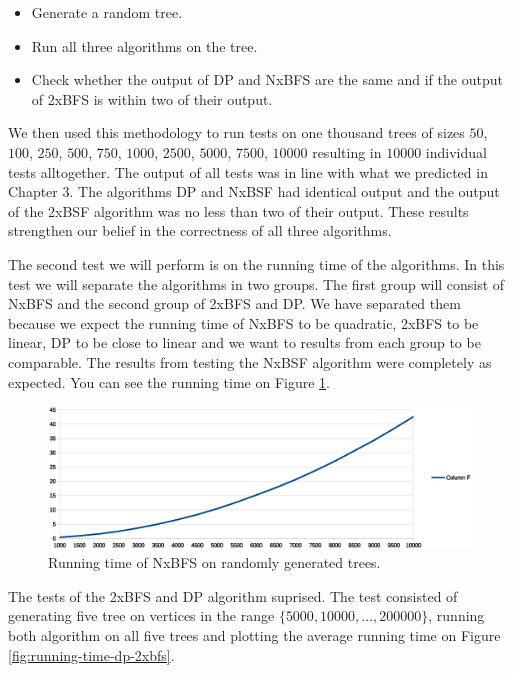 \begin{itemize}
    \item Generate a random tree.
    \item Run all three algorithms on the tree.
    \item Check whether the output of DP and NxBFS are the same and if the output of 2xBFS is within two of their output.
\end{itemize}

We then used this methodology to run tests on one thousand trees of sizes $50$, $100$, $250$, $500$, $750$, $1000$, $2500$, $5000$, $7500$, $10000$ resulting in $10000$ individual tests alltogether. The output of all tests was in line with what we predicted in Chapter 3. The algorithms DP and NxBSF had identical output and the output of the 2xBSF algorithm was no less than two of their output. These results strengthen our belief in the correctness of all three algorithms.

The second test we will perform is on the running time of the algorithms. In this test we will separate the algorithms in two groups. The first group will consist of NxBFS and the second group of 2xBFS and DP. We have separated them because we expect the running time of NxBFS to be quadratic, 2xBFS to be linear, DP to be close to linear and we want to results from each group to be comparable. The results from testing the NxBSF algorithm were completely as expected. You can see the running time on Figure \ref{fig:running-time-nxbfs}.

\begin{figure}[h]%
    \centering
    \includegraphics[center, scale=0.6 ]{./images/empirical/chart-nbfs.eps}
    \caption{Running time of NxBFS on randomly generated trees. }%
    \label{fig:running-time-nxbfs}%
\end{figure}


The tests of the 2xBFS and DP algorithm suprised. The test consisted of generating five tree on vertices in the range $\{5000, 10000, ..., 200000\}$, running both algorithm on all five trees and plotting the average running time on Figure \ref{fig:running-time-dp-2xbfs}.

